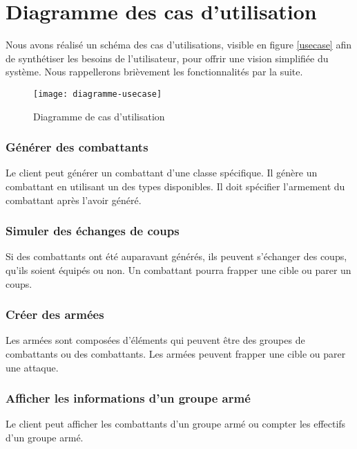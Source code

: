 \section{Diagramme des cas d'utilisation}

Nous avons réalisé un schéma des cas d'utilisations, visible en figure \vref{usecase} afin de synthétiser les besoins de l'utilisateur, pour offrir une vision simplifiée du système. Nous rappellerons brièvement les fonctionnalités par la suite.

\begin{figure}[h]
\begin{center}
    \texttt{[image: diagramme-usecase]}
\end{center}
    \caption{Diagramme de cas d'utilisation}
    \label{usecase}                      
\end{figure}

\subsubsection{Générer des combattants}

Le client peut générer un combattant d'une classe spécifique. Il génère un combattant en utilisant un des types disponibles. Il doit spécifier l'armement du combattant après l'avoir généré.

\subsubsection{Simuler des échanges de coups}

Si des combattants ont été auparavant générés, ils peuvent s'échanger des coups, qu'ils soient équipés ou non.
Un combattant pourra frapper une cible ou parer un coups.

\subsubsection{Créer des armées}

Les armées sont composées d'éléments qui peuvent être des groupes de combattants ou des combattants. Les armées
peuvent frapper une cible ou parer une attaque.

\subsubsection{Afficher les informations d'un groupe armé}

Le client peut afficher les combattants d'un groupe armé ou compter les effectifs d'un groupe armé.

